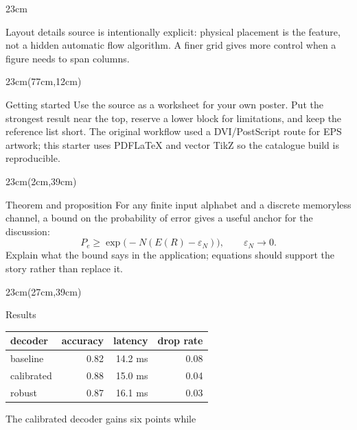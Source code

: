 \documentclass[final]{beamer}
\begin{document}
\begin{frame}[t]
\begin{textblock*}{23cm}
\begin{block}{Layout details}
  source is intentionally explicit: physical placement is the feature, not a
  hidden automatic flow algorithm. A finer grid gives more control when a
  figure needs to span columns.
  \begin{center}
  \end{center}
\end{block}\end{textblock*}
\begin{textblock*}{23cm}(77cm,12cm)\begin{block}{Getting started}
  Use the source as a worksheet for your own poster. Put the strongest result
  near the top, reserve a lower block for limitations, and keep the reference
  list short. The original workflow used a DVI/PostScript route for EPS
  artwork; this starter uses PDFLaTeX and vector TikZ so the catalogue build
  is reproducible.
\end{block}\end{textblock*}
\begin{textblock*}{23cm}(2cm,39cm)\begin{block}{Theorem and proposition}
  For any finite input alphabet and a discrete memoryless channel, a bound on
  the probability of error gives a useful anchor for the discussion:
  \[
    P_e \geq \exp\bigl(-N(E(R)-\varepsilon_N)\bigr),\qquad \varepsilon_N\to0.
  \]
  Explain what the bound says in the application; equations should support
  the story rather than replace it.
\end{block}\end{textblock*}
\begin{textblock*}{23cm}(27cm,39cm)\begin{block}{Results}
  \centering\begin{tabular}{lrrr}\toprule
  decoder & accuracy & latency & drop rate\\\midrule
  baseline & 0.82 & 14.2 ms & 0.08\\
  calibrated & 0.88 & 15.0 ms & 0.04\\
  robust & 0.87 & 16.1 ms & 0.03\\\bottomrule
  \end{tabular}
  \vspace{0.5cm}\raggedright The calibrated decoder gains six points while

\end{block}
\end{textblock*}
\end{frame}
\end{document}
